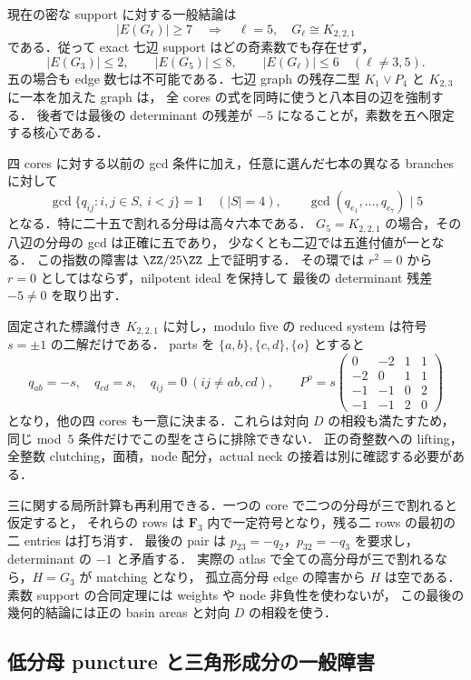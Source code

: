現在の密な support に対する一般結論は
\[
 |E(G_\ell)|\geq7
 \quad\Longrightarrow\quad
 \ell=5,\quad G_\ell\cong K_{2,2,1}
\]
である．従って exact 七辺 support はどの奇素数でも存在せず，
\[
 |E(G_3)|\leq2,\qquad |E(G_5)|\leq8,\qquad
 |E(G_\ell)|\leq6\quad(\ell\ne3,5).
\]
五の場合も edge 数七は不可能である．七辺 graph の残存二型
$K_1\vee P_4$ と $K_{2,3}$ に一本を加えた graph は，
全 cores の式を同時に使うと八本目の辺を強制する．
後者では最後の determinant の残差が $-5$ になることが，素数を五へ限定する核心である．

四 cores に対する以前の gcd 条件に加え，任意に選んだ七本の異なる branches に対して
\[
 \gcd\{q_{ij}:i,j\in S,\ i<j\}=1\quad(|S|=4),
 \qquad
 \gcd(q_{e_1},\ldots,q_{e_7})\mid5
\]
となる．特に二十五で割れる分母は高々六本である．
$G_5=K_{2,2,1}$ の場合，その八辺の分母の gcd は正確に五であり，
少なくとも二辺では五進付値が一となる．
この指数の障害は $\ZZ/25\ZZ$ 上で証明する．
その環では $r^2=0$ から $r=0$ としてはならず，nilpotent ideal を保持して
最後の determinant 残差 $-5\ne0$ を取り出す．

固定された標識付き $K_{2,2,1}$ に対し，modulo five の reduced system は符号 $s=\pm1$ の二解だけである．
parts を $\{a,b\},\{c,d\},\{o\}$ とすると
\[
 q_{ab}=-s,\quad q_{cd}=s,\quad q_{ij}=0\ (ij\ne ab,cd),
 \qquad
 P^o=s\begin{pmatrix}
 0&-2&1&1\\-2&0&1&1\\-1&-1&0&2\\-1&-1&2&0
 \end{pmatrix}
\]
となり，他の四 cores も一意に決まる．これらは対向 $D$ の相殺も満たすため，
同じ mod~$5$ 条件だけでこの型をさらに排除できない．
正の奇整数への lifting，全整数 clutching，面積，node 配分，actual neck の接着は別に確認する必要がある．

三に関する局所計算も再利用できる．一つの core で二つの分母が三で割れると仮定すると，
それらの rows は $\mathbf F_3$ 内で一定符号となり，残る二 rows の最初の二 entries は打ち消す．
最後の pair は $p_{23}=-q_2$，$p_{32}=-q_3$ を要求し，determinant の $-1$ と矛盾する．
実際の atlas で全ての高分母が三で割れるなら，$H=G_3$ が matching となり，
孤立高分母 edge の障害から $H$ は空である．
素数 support の合同定理には weights や node 非負性を使わないが，
この最後の幾何的結論には正の basin areas と対向 $D$ の相殺を使う．

\subsection{低分母 puncture と三角形成分の一般障害}

